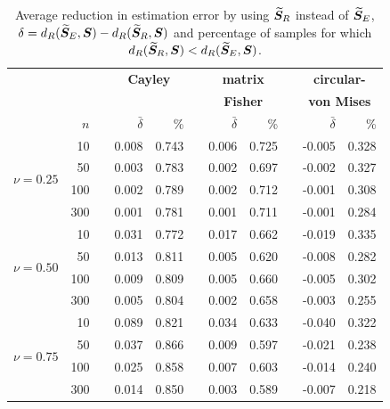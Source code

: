 \begin{table}[h]
\caption{Average reduction in estimation error by using ${\widetilde{\bm S}_R}$ instead of ${\widetilde{\bm S}_E}$, $\delta={d_R}({\widetilde{\bm S}_E},\bm S) - {d_R}({\widetilde{\bm S}_R},\bm S)$ and percentage of samples for which ${d_R}({\widetilde{\bm S}_R},\bm S) < {d_R}({\widetilde{\bm S}_E},\bm S)$.}
\label{tab:percL1}
\begin{center}
\begin{tabular}{rrcrrcrrcrr}
  \hline
  & &&\multicolumn{2}{c}{\textbf{Cayley}} & &\multicolumn{2}{c}{\textbf{matrix} } &&\multicolumn{2}{c}{\textbf{circular-}}\\
    && &\multicolumn{2}{c}{} & &\multicolumn{2}{c}{\textbf{Fisher}} & &\multicolumn{2}{c}{\textbf{von Mises}}\\ 
\rule[2mm]{0mm}{3mm} 
  &  $n$ && $\bar{\delta}$ & \% & & $\bar{\delta}$ & \% & & $\bar{\delta}$ & \% \\ 
  \hline \hline
  \multirow{4}{*}{$\nu=0.25$} 
  &   10 & & 0.008 & 0.743 & &  0.006 & 0.725 & & -0.005 & 0.328 \\ 
  &   50 & &  0.003 & 0.783 & &  0.002 & 0.697 & & -0.002 & 0.327 \\ 
  &  100 & &  0.002 & 0.789 & & 0.002 & 0.712 & & -0.001 & 0.308 \\ 
  &  300 & & 0.001 & 0.781 & & 0.001 & 0.711 & & -0.001 & 0.284 \\ \hline
  \multirow{4}{*}{$\nu=0.50$} 
   &   10 & & 0.031 & 0.772 & &  0.017 & 0.662 & &  -0.019 & 0.335 \\ 
   &   50 & & 0.013 & 0.811 & & 0.005 & 0.620 & &-0.008 & 0.282 \\ 
   &  100 & & 0.009 & 0.809 & &  0.005 & 0.660 & &  -0.005 & 0.302 \\ 
   &  300 & & 0.005 & 0.804 & &  0.002 & 0.658 & & -0.003 & 0.255 \\ \hline
   \multirow{4}{*}{$\nu=0.75$} 
  &  10 & & 0.089 & 0.821 & & 0.034 & 0.633 & & -0.040 & 0.322 \\ 
  &   50 & & 0.037 & 0.866 & & 0.009 & 0.597 & & -0.021 & 0.238 \\ 
  &  100 & &  0.025 & 0.858 & & 0.007 & 0.603 & & -0.014 & 0.240 \\ 
  &  300 & &  0.014 & 0.850 &&  0.003 & 0.589 & & -0.007 & 0.218 \\ 
   \hline
\end{tabular}
\end{center}
\end{table}

